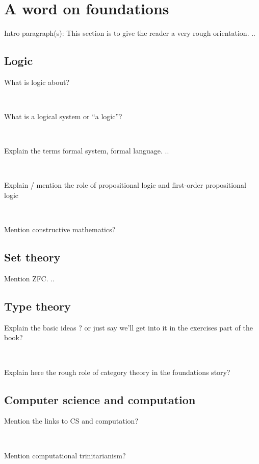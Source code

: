 
\section{A word on foundations}


Intro paragraph(s):
This section is to give the reader a very rough orientation.
..

\subsection{Logic}

What is logic about?

\

What is a logical system or ``a logic''?

\

Explain the terms formal system, formal language.
..

\

Explain / mention the role of propositional logic and first-order propositional logic

\

Mention constructive mathematics?

\subsection{Set theory}

Mention ZFC.
..

\subsection{Type theory}

Explain the basic ideas ?
or just say we'll get into it in the exercises part of the book?

\

Explain here the rough role of category theory in the foundations story?

\subsection{Computer science and computation}

Mention the links to CS and computation?

\

Mention computational trinitarianism?

